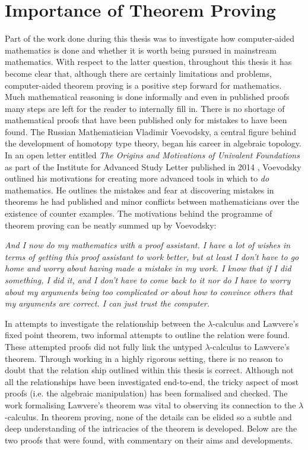 \section{Importance of Theorem Proving}
Part of the  work done during this thesis was to investigate how computer-aided
mathematics is done and whether it is worth being pursued in mainstream
mathematics. With respect to the latter question, throughout this thesis it has
become clear that, although there are certainly limitations and problems,
computer-aided theorem proving is a positive step forward for mathematics. Much
mathematical reasoning is done informally and even in published proofs many
steps are left for the reader to internally fill in. There is no shortage of
mathematical proofs that have been published only for mistakes to have been
found. The Russian Mathematician Vladimir Voevodsky, a central figure behind the
development of homotopy type theory, began his career in algebraic topology.  In
an open letter entitled \textit{The Origins and Motivations of Univalent
Foundations} as part of the  Institute for Advanced Study Letter published in 2014 \cite{sorlin2014iasthe}, Voevodsky outlined his
motivations for creating more advanced tools in which to \textit{do} mathematics.
He outlines the mistakes and fear at discovering mistakes in theorems he had
published and minor conflicts between mathematicians over the existence of
counter examples. The motivations behind the programme of theorem proving can be
neatly summed up by Voevodsky:

\begin{displayquote}
    \textit{And I now do my mathematics with a proof assistant. I have a lot of wishes
    in terms of getting this proof assistant to work better, but at least I
    don’t have to go home and worry about having made a mistake in my work. I
    know that if I did something, I did it, and I don’t have to come back to it
    nor do I have to worry about my arguments being too complicated or about how
    to convince others that my arguments are correct. I can just trust the
    computer.}
\end{displayquote}

In attempts to investigate the relationship between the $\lambda$-calculus and
Lawvere's fixed point theorem, two informal attempts to outline the relation
were found. These attempted proofs did not fully link the untyped
$\lambda$-calculus to Lawvere's theorem. Through working in a highly rigorous
setting, there is no reason to doubt that the relation ship outlined within this thesis is
correct. Although not all the relationships have been investigated end-to-end,
the tricky aspect of most proofs (i.e. the algebraic manipulation) has been
formalised and checked. The work formalising Lawvere's theorem was vital to
observing its connection to the $\lambda$-calculus. In
theorem proving, none of the details can be elided so a subtle and deep
understanding of the intricacies of the theorem is developed. Below are the two
proofs that were found, with commentary on their aims and developments.

